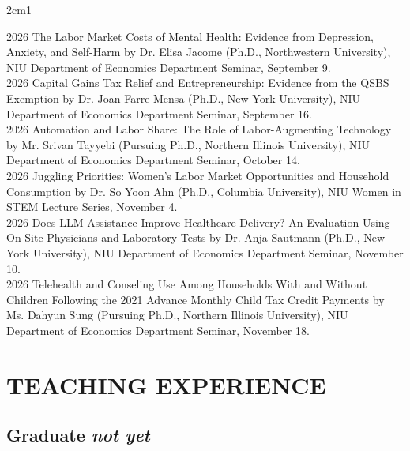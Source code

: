 \documentclass[final, 12pt]{article}
\begin{document}
\begin{hangparas}{2cm}{1}

2026 \tabto{2cm} The Labor Market Costs of Mental Health: Evidence from Depression, Anxiety, and Self-Harm by Dr. Elisa Jacome (Ph.D., Northwestern University), NIU Department of Economics Department Seminar, September 9. \\

2026 \tabto{2cm} Capital Gains Tax Relief and Entrepreneurship: Evidence from the QSBS Exemption by Dr. Joan Farre-Mensa (Ph.D., New York University), NIU Department of Economics Department Seminar, September 16. \\

2026 \tabto{2cm} Automation and Labor Share: The Role of Labor-Augmenting Technology by Mr. Srivan Tayyebi (Pursuing Ph.D., Northern Illinois University), NIU Department of Economics Department Seminar, October 14. \\

2026 \tabto{2cm} Juggling Priorities: Women's Labor Market Opportunities and Household Consumption by Dr. So Yoon Ahn (Ph.D., Columbia University), NIU Women in STEM Lecture Series, November 4. \\

2026 \tabto{2cm} Does LLM Assistance Improve Healthcare Delivery? An Evaluation Using On-Site Physicians and Laboratory Tests by Dr. Anja Sautmann (Ph.D., New York University), NIU Department of Economics Department Seminar, November 10. \\

2026 \tabto{2cm} Telehealth and Conseling Use Among Households With and Without Children Following the 2021 Advance Monthly Child Tax Credit Payments by Ms. Dahyun Sung (Pursuing Ph.D., Northern Illinois University), NIU Department of Economics Department Seminar, November 18. \\

\end{hangparas}


\section*{TEACHING EXPERIENCE}

\subsection*{Graduate \it not yet}

 
\end{document}
